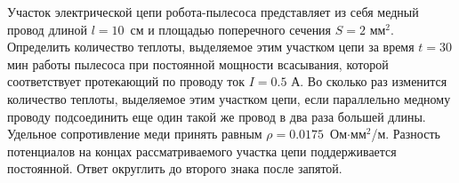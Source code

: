 
Участок электрической цепи робота-пылесоса представляет из себя медный провод длиной $l=10$~см и  площадью 
поперечного сечения $S=2$ мм$^2$. Определить количество теплоты, выделяемое этим участком цепи за время $t=30$ мин 
работы пылесоса при постоянной мощности всасывания, которой соответствует протекающий по проводу ток $I=0.5$ А.  
Во сколько раз  изменится количество теплоты, выделяемое этим участком цепи, если параллельно медному проводу  
подсоединить еще один такой же провод в два раза большей длины. Удельное сопротивление меди принять равным $\rho=0.0175$~Ом$\cdot$мм$^2$/м. 
Разность потенциалов на концах рассматриваемого участка цепи поддерживается постоянной. Ответ округлить до 
второго знака после запятой.